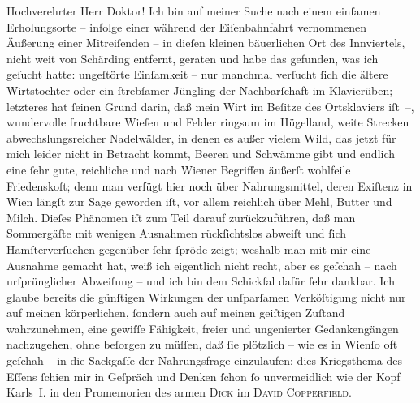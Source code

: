 \pstart{}Hochverehrter Herr Doktor!\pend\vspace{0.5em}
\pstart
           Ich bin auf meiner Suche nach einem einſamen Erholungsorte – infolge einer während
               der Eiſenbahnfahrt vernommenen Äußerung einer Mitreiſenden – in dieſen kleinen
               bäuerlichen Ort des Innviertels, nicht weit von
                  Schärding entfernt, geraten und habe das
               gefunden, was ich geſucht hatte: ungeſtörte Einſamkeit – nur manchmal verſucht{ }ſich
               die ältere Wirtstochter oder
               ein{ }ſtrebſamer Jüngling der Nachbarſchaft im Klavierüben; letzteres hat{ }ſeinen Grund
               darin, daß mein Wirt im
               Beſitze des Ortsklaviers iſt –, wundervolle fruchtbare Wieſen und Felder ringsum im
               Hügelland, weite Strec{\pb}ken
               abwechslungsreicher Nadelwälder, in denen es außer vielem Wild, das jetzt für mich
               leider nicht in Betracht kommt, Beeren und Schwämme gibt und endlich eine{ }ſehr gute,
               reichliche und nach Wiener Begriffen äußerſt
               wohlfeile Friedenskoſt; denn man verfügt hier noch über Nahrungsmittel, deren
               Exiſtenz in Wien längſt zur Sage geworden iſt, vor
               allem reichlich über Mehl, Butter und Milch. Dieſes Phänomen iſt zum Teil darauf
               zurückzuführen, daß man Sommergäſte mit wenigen Ausnahmen rückſichtslos abweiſt und{ }ſich Hamſterverſuchen gegenüber{ }ſehr{ }ſpröde zeigt; weshalb man mit mir eine Ausnahme
               gemacht hat, weiß ich eigentlich nicht recht, aber es geſchah – nach urſprünglicher
               Abweiſung – und ich bin dem Schickſal dafür{ }ſehr dankbar. Ich glaube bereits die
               günſtigen Wirkungen der unſparſamen {\pb}Verköſtigung nicht nur auf meinen körperlichen,{ }ſondern auch auf meinen geiſtigen
               Zuſtand wahrzunehmen, eine gewiſſe Fähigkeit, freier und ungenierter Gedankengängen
               nachzugehen, ohne beſorgen zu müſſen, daß{ }ſie plötzlich – wie es in Wienſo oft geſchah – in die Sackgaſſe der Nahrungsfrage
               einzulaufen: dies Kriegsthema des Eſſens{ }ſchien mir in Geſpräch und Denken{ }ſchon{ }ſo
               unvermeidlich wie der Kopf Karls I. in den Promemorien des armen \textsc{Dick} im \textsc{David Copperfield}.\pend
           

